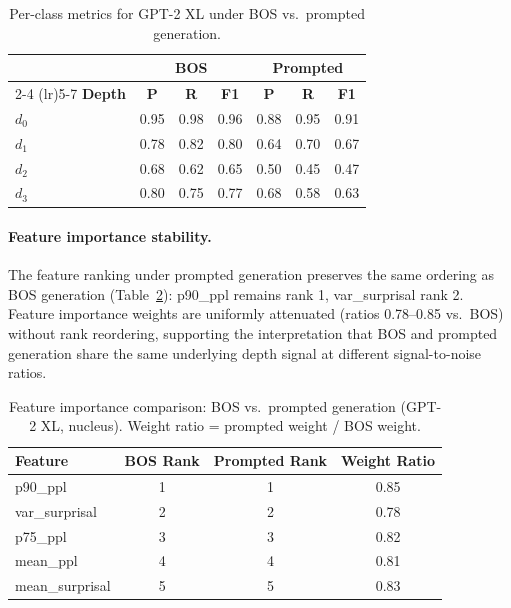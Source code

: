 \documentclass[11pt,a4paper]{article}
\begin{document}
\begin{table}[t]
\centering
\caption{Per-class metrics for GPT-2 XL under BOS vs.\ prompted generation.}
\label{tab:prompted-perclass}
\begin{tabular}{l ccc ccc}
\toprule
 & \multicolumn{3}{c}{\textbf{BOS}} & \multicolumn{3}{c}{\textbf{Prompted}} \\
\cmidrule(lr){2-4} \cmidrule(lr){5-7}
\textbf{Depth} & \textbf{P} & \textbf{R} & \textbf{F1} & \textbf{P} & \textbf{R} & \textbf{F1} \\
\midrule
$d_0$ & 0.95 & 0.98 & 0.96 & 0.88 & 0.95 & 0.91 \\
$d_1$ & 0.78 & 0.82 & 0.80 & 0.64 & 0.70 & 0.67 \\
$d_2$ & 0.68 & 0.62 & 0.65 & 0.50 & 0.45 & 0.47 \\
$d_3$ & 0.80 & 0.75 & 0.77 & 0.68 & 0.58 & 0.63 \\
\bottomrule
\end{tabular}
\end{table}

\paragraph{Feature importance stability.} The feature ranking under prompted generation preserves the same ordering as BOS generation (Table~\ref{tab:prompted-features}): p90\_ppl remains rank 1, var\_surprisal rank 2. Feature importance weights are uniformly attenuated (ratios 0.78--0.85 vs.\ BOS) without rank reordering, supporting the interpretation that BOS and prompted generation share the same underlying depth signal at different signal-to-noise ratios.

\begin{table}[t]
\centering
\caption{Feature importance comparison: BOS vs.\ prompted generation (GPT-2 XL, nucleus). Weight ratio = prompted weight / BOS weight.}
\label{tab:prompted-features}
\begin{tabular}{lccc}
\toprule
\textbf{Feature} & \textbf{BOS Rank} & \textbf{Prompted Rank} & \textbf{Weight Ratio} \\
\midrule
p90\_ppl & 1 & 1 & 0.85 \\
var\_surprisal & 2 & 2 & 0.78 \\
p75\_ppl & 3 & 3 & 0.82 \\
mean\_ppl & 4 & 4 & 0.81 \\
mean\_surprisal & 5 & 5 & 0.83 \\
\bottomrule
\end{tabular}
\end{table}
\end{document}
